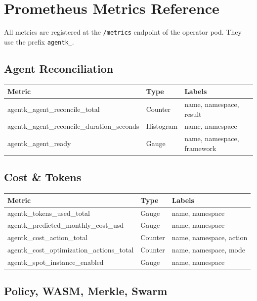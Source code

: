 \documentclass[12pt,a4paper,openany]{report}
\begin{document}
\chapter{Prometheus Metrics Reference}

All metrics are registered at the \texttt{/metrics} endpoint of the operator pod. They use the prefix \texttt{agentk\_}.

\section{Agent Reconciliation}

\begin{longtable}{p{6cm}p{2cm}p{5cm}}
\toprule
\textbf{Metric} & \textbf{Type} & \textbf{Labels} \\
\midrule
agentk\_agent\_reconcile\_total & Counter & name, namespace, result \\
agentk\_agent\_reconcile\_duration\_seconds & Histogram & name, namespace \\
agentk\_agent\_ready & Gauge & name, namespace, framework \\
\bottomrule
\end{longtable}

\section{Cost \& Tokens}

\begin{longtable}{p{6cm}p{2cm}p{5cm}}
\toprule
\textbf{Metric} & \textbf{Type} & \textbf{Labels} \\
\midrule
agentk\_tokens\_used\_total & Gauge & name, namespace \\
agentk\_predicted\_monthly\_cost\_usd & Gauge & name, namespace \\
agentk\_cost\_action\_total & Counter & name, namespace, action \\
agentk\_cost\_optimization\_actions\_total & Counter & name, namespace, mode \\
agentk\_spot\_instance\_enabled & Gauge & name, namespace \\
\bottomrule
\end{longtable}

\section{Policy, WASM, Merkle, Swarm}
\end{document}
